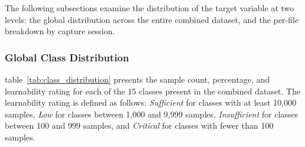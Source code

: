\documentclass[12pt,a4paper]{article}
\begin{document}
The following subsections examine the distribution of the target variable at two levels:
the global distribution across the entire combined dataset, and the per-file breakdown
by capture session.

\subsubsection{Global Class Distribution}

table~\ref{tab:class_distribution} presents the sample count, percentage, and
learnability rating for each of the 15 classes present in the combined dataset.
The learnability rating is defined as follows: \textit{Sufficient} for classes with at
least 10,000 samples, \textit{Low} for classes between 1,000 and 9,999 samples,
\textit{Insufficient} for classes between 100 and 999 samples, and \textit{Critical}
for classes with fewer than 100 samples.
\end{document}
